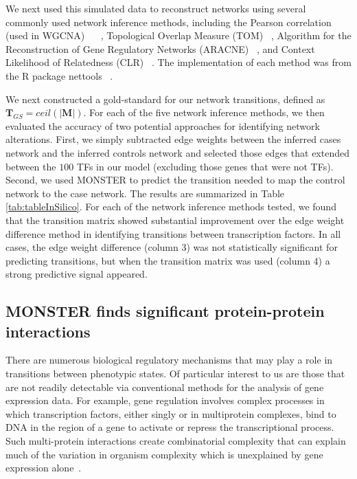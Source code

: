 We next used this simulated data to reconstruct networks using several commonly used network inference methods, including the Pearson correlation (used in WGCNA) ~\cite{Langfelder2008WGCNA} ~\cite{Langfelder2008FastR}, Topological Overlap Measure (TOM) ~\cite{ravasz2002hierarchical}, Algorithm for the Reconstruction of Gene Regulatory Networks (ARACNE) ~\cite{margolin2006aracne}, and Context Likelihood of Relatedness (CLR) ~\cite{faith2007large}. The implementation of each method was from the R package nettools ~\cite{nettools}.

We next constructed a gold-standard for our network transitions, defined as $\mathbf{T}_{GS}=ceil(|\mathbf{M}|)$. For each of the five network inference methods, we then evaluated the accuracy of two potential approaches for identifying network alterations. First, we simply subtracted edge weights between the inferred cases network and the inferred controls network and selected those edges that extended between the $100$ TFs in our model (excluding those genes that were not TFs). Second, we used MONSTER to predict the transition needed to map the control network to the case network. The results are summarized in Table \ref{tab:tableInSilico}. For each of the network inference methods tested, we found that the transition matrix showed substantial improvement over the edge weight difference method in identifying transitions between transcription factors. In all cases, the edge weight difference (column 3) was not statistically significant for predicting transitions, but when the transition matrix was used (column 4) a strong predictive signal appeared. 

\subsection*{MONSTER finds significant protein-protein interactions}

There are numerous biological regulatory mechanisms that may play a role in transitions between phenotypic states. Of particular interest to us are those that are not readily detectable via conventional methods for the analysis of gene expression data. For example, gene regulation involves complex processes in which transcription factors, either singly or in multiprotein complexes, bind to DNA in the region of a gene to activate or repress the transcriptional process. Such multi-protein interactions create combinatorial complexity that can explain much of the variation in organism complexity which is unexplained by gene expression alone~\cite{levine2003transcription}.

